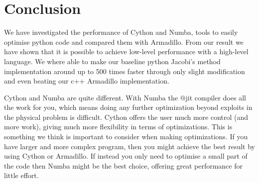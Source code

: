 \section*{Conclusion}
We have investigated the performance of Cython and Numba, tools to easily
optimise python code and compared them with Armadillo.
From our result we have shown that it is possible to achieve low-level
performance with a high-level language. We where able to make our baseline
python Jacobi's method implementation around up to 500 times faster through only
slight modification and even beating our c++ Armadillo implementation.

Cython and Numba are quite different. With Numba
the @jit compiler does all the work for you, which means doing any further
optimization beyond exploits in the physical problem is difficult.
Cython offers the user much more control (and more work), giving
much more flexibility in terms of optimizations. This is something we think is
important to consider when making optimizations. If you have larger and more
complex program, then you might achieve the best result by using Cython or
Armadillo. If instead you only need to optimise a small part of the code then
Numba might be the best choice, offering great performance for little effort.
